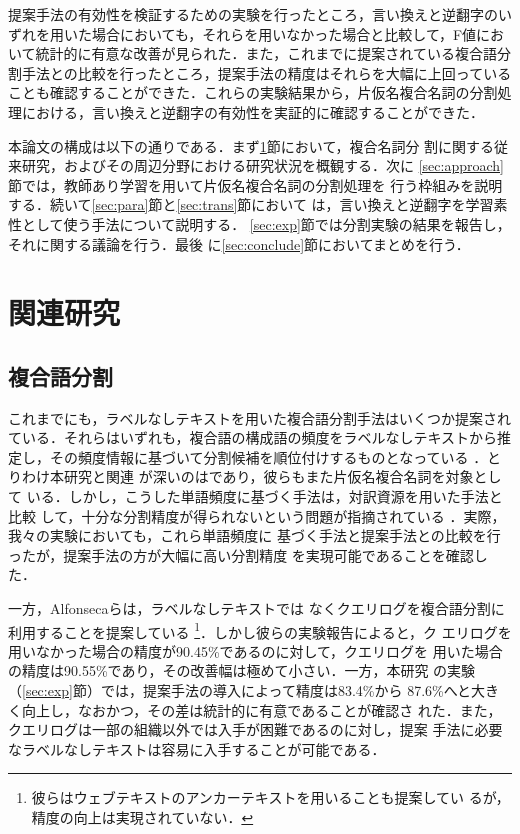 \documentclass[japanese]{jnlp_1.4}
\begin{document}
提案手法の有効性を検証するための実験を行ったところ，言い換えと逆翻字のい
ずれを用いた場合においても，それらを用いなかった場合と比較して，F値にお
いて統計的に有意な改善が見られた．また，これまでに提案されている複合語分
割手法との比較を行ったところ，提案手法の精度はそれらを大幅に上回っている
ことも確認することができた．これらの実験結果から，片仮名複合名詞の分割処
理における，言い換えと逆翻字の有効性を実証的に確認することができた．

本論文の構成は以下の通りである．まず\ref{sec:prev}節において，複合名詞分
割に関する従来研究，およびその周辺分野における研究状況を概観する．次に
\ref{sec:approach}節では，教師あり学習を用いて片仮名複合名詞の分割処理を
行う枠組みを説明する．続いて\ref{sec:para}節と\ref{sec:trans}節において
は，言い換えと逆翻字を学習素性として使う手法について説明する．
\ref{sec:exp}節では分割実験の結果を報告し，それに関する議論を行う．最後
に\ref{sec:conclude}節においてまとめを行う．



\section{関連研究} \label{sec:prev}

\subsection{複合語分割}  \label{sec:prev_comp}

これまでにも，ラベルなしテキストを用いた複合語分割手法はいくつか提案され
ている．それらはいずれも，複合語の構成語の頻度をラベルなしテキストから推
定し，その頻度情報に基づいて分割候補を順位付けするものとなっている
\cite{Koehn03,Ando03,Schiller05,Nakazawa05,Holz08}．とりわけ本研究と関連
が深いのは\cite{Nakazawa05}であり，彼らもまた片仮名複合名詞を対象として
いる．しかし，こうした単語頻度に基づく手法は，対訳資源を用いた手法と比較
して，十分な分割精度が得られないという問題が指摘されている
\cite{Koehn03,Nakazawa05}．実際，我々の実験においても，これら単語頻度に
基づく手法と提案手法との比較を行ったが，提案手法の方が大幅に高い分割精度
を実現可能であることを確認した．

一方，Alfonsecaら\citeyear{AlfonsecaCICLing08}は，ラベルなしテキストでは
なくクエリログを複合語分割に利用することを提案している
\footnote{彼らはウェブテキストのアンカーテキストを用いることも提案してい
るが，精度の向上は実現されていない．}．しかし彼らの実験報告によると，ク
エリログを用いなかった場合の精度が90.45\%であるのに対して，クエリログを
用いた場合の精度は90.55\%であり，その改善幅は極めて小さい．一方，本研究
の実験（\ref{sec:exp}節）では，提案手法の導入によって精度は83.4\%から
87.6\%へと大きく向上し，なおかつ，その差は統計的に有意であることが確認さ
れた．また，クエリログは一部の組織以外では入手が困難であるのに対し，提案
手法に必要なラベルなしテキストは容易に入手することが可能である．
\end{document}
